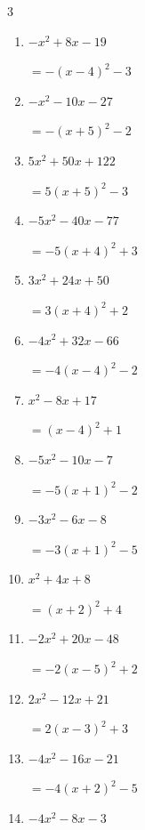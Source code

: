 \begin{multicols}{3}
\begin{enumerate}
        $=-3\left( x-1\right)^{2}+3$

\columnbreak %

  \item $-x^{2}+8x-19$

        $=-\left( x-4\right)^{2}-3$

  \item $-x^{2}-10x-27$

        $=-\left( x+5\right)^{2}-2$

  \item $5x^{2}+50x+122$

        $=5\left( x+5\right)^{2}-3$

  \item $-5x^{2}-40x-77$

        $=-5\left( x+4\right)^{2}+3$

  \item $3x^{2}+24x+50$

        $=3\left( x+4\right)^{2}+2$

  \item $-4x^{2}+32x-66$

        $=-4\left( x-4\right)^{2}-2$

  \item $x^{2}-8x+17$

        $=\left( x-4\right)^{2}+1$

  \item $-5x^{2}-10x-7$

        $=-5\left( x+1\right)^{2}-2$

  \item $-3x^{2}-6x-8$

        $=-3\left( x+1\right)^{2}-5$

  \item $x^{2}+4x+8$

        $=\left( x+2\right)^{2}+4$

\columnbreak %

  \item $-2x^{2}+20x-48$

        $=-2\left( x-5\right)^{2}+2$

  \item $2x^{2}-12x+21$

        $=2\left( x-3\right)^{2}+3$

  \item $-4x^{2}-16x-21$

        $=-4\left( x+2\right)^{2}-5$

  \item $-4x^{2}-8x-3$


\end{enumerate}
\end{multicols}
